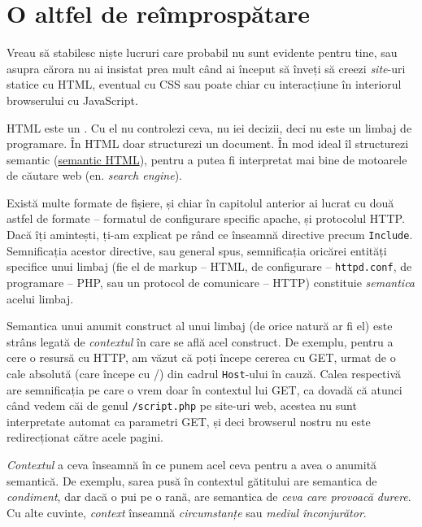 \section{O altfel de reîmprospătare}

Vreau să stabilesc niște lucruri care probabil nu sunt evidente
pentru tine, sau asupra cărora nu ai insistat prea mult
când ai început să înveți să creezi \textit{site}-uri statice
cu HTML, eventual cu CSS sau poate chiar cu interacțiune
în interiorul browserului cu JavaScript.

HTML este un .
Cu el nu controlezi ceva, nu iei decizii, deci nu este
un limbaj de programare. În HTML doar
structurezi un document. În mod ideal îl structurezi
semantic (\href{http://en.wikipedia.org/wiki/Semantic_HTML}{semantic HTML}),
pentru a putea fi interpretat mai bine de motoarele de căutare web
(en. \textsl{search engine}).

Există multe formate de fișiere, și chiar în capitolul anterior ai
lucrat cu două astfel de formate -- formatul de configurare specific apache, și protocolul
HTTP. Dacă îți amintești,
ți-am explicat pe rând ce înseamnă directive precum \texttt{Include}.
Semnificația acestor directive, sau general spus, semnificația oricărei
entități specifice unui limbaj (fie el de markup -- HTML, de configurare
-- \texttt{httpd.conf}, de programare -- PHP, sau un protocol de
comunicare -- HTTP) constituie \textsl{semantica}
acelui limbaj.

Semantica unui anumit construct al unui limbaj (de orice natură
ar fi el) este strâns legată de \textit{contextul} în care se află acel
construct.
De exemplu, pentru a cere o resursă cu HTTP, am văzut că
poți începe cererea cu GET, urmat
de o cale absolută (care începe cu {\glqq}/{\grqq}) din cadrul \texttt{Host}-ului
în cauză. Calea respectivă are semnificația pe care o vrem
doar în contextul lui {\glqq}GET{\grqq}, ca dovadă că atunci când vedem
căi de genul \texttt{/script.php} pe site-uri web,
acestea nu sunt interpretate automat ca parametri GET, și
deci browserul nostru nu este redirecționat către acele pagini.

\textsl{Contextul} a ceva înseamnă în ce punem acel ceva pentru a
avea o anumită semantică. De exemplu, sarea pusă în contextul
gătitului are semantica de \textit{condiment}, dar dacă
o pui pe o rană, are semantica de \textit{ceva care provoacă durere}.
Cu alte cuvinte, \textsl{context} înseamnă
\textsl{circumstanțe} sau \textsl{mediul înconjurător}. 

